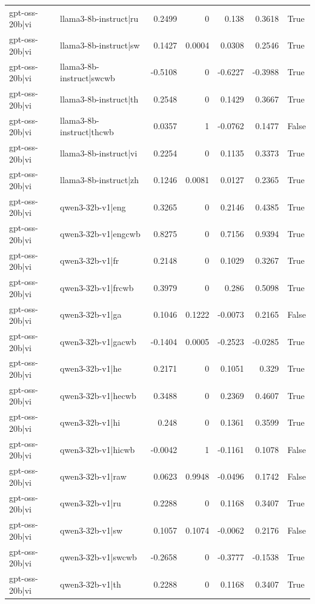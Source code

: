 \begin{table}
\begin{tabular}{l l r r r r l}
gpt-oss-20b|vi & llama3-8b-instruct|ru & 0.2499 & 0 & 0.138 & 0.3618 & True \\
gpt-oss-20b|vi & llama3-8b-instruct|sw & 0.1427 & 0.0004 & 0.0308 & 0.2546 & True \\
gpt-oss-20b|vi & llama3-8b-instruct|swcwb & -0.5108 & 0 & -0.6227 & -0.3988 & True \\
gpt-oss-20b|vi & llama3-8b-instruct|th & 0.2548 & 0 & 0.1429 & 0.3667 & True \\
gpt-oss-20b|vi & llama3-8b-instruct|thcwb & 0.0357 & 1 & -0.0762 & 0.1477 & False \\
gpt-oss-20b|vi & llama3-8b-instruct|vi & 0.2254 & 0 & 0.1135 & 0.3373 & True \\
gpt-oss-20b|vi & llama3-8b-instruct|zh & 0.1246 & 0.0081 & 0.0127 & 0.2365 & True \\
gpt-oss-20b|vi & qwen3-32b-v1|eng & 0.3265 & 0 & 0.2146 & 0.4385 & True \\
gpt-oss-20b|vi & qwen3-32b-v1|engcwb & 0.8275 & 0 & 0.7156 & 0.9394 & True \\
gpt-oss-20b|vi & qwen3-32b-v1|fr & 0.2148 & 0 & 0.1029 & 0.3267 & True \\
gpt-oss-20b|vi & qwen3-32b-v1|frcwb & 0.3979 & 0 & 0.286 & 0.5098 & True \\
gpt-oss-20b|vi & qwen3-32b-v1|ga & 0.1046 & 0.1222 & -0.0073 & 0.2165 & False \\
gpt-oss-20b|vi & qwen3-32b-v1|gacwb & -0.1404 & 0.0005 & -0.2523 & -0.0285 & True \\
gpt-oss-20b|vi & qwen3-32b-v1|he & 0.2171 & 0 & 0.1051 & 0.329 & True \\
gpt-oss-20b|vi & qwen3-32b-v1|hecwb & 0.3488 & 0 & 0.2369 & 0.4607 & True \\
gpt-oss-20b|vi & qwen3-32b-v1|hi & 0.248 & 0 & 0.1361 & 0.3599 & True \\
gpt-oss-20b|vi & qwen3-32b-v1|hicwb & -0.0042 & 1 & -0.1161 & 0.1078 & False \\
gpt-oss-20b|vi & qwen3-32b-v1|raw & 0.0623 & 0.9948 & -0.0496 & 0.1742 & False \\
gpt-oss-20b|vi & qwen3-32b-v1|ru & 0.2288 & 0 & 0.1168 & 0.3407 & True \\
gpt-oss-20b|vi & qwen3-32b-v1|sw & 0.1057 & 0.1074 & -0.0062 & 0.2176 & False \\
gpt-oss-20b|vi & qwen3-32b-v1|swcwb & -0.2658 & 0 & -0.3777 & -0.1538 & True \\
gpt-oss-20b|vi & qwen3-32b-v1|th & 0.2288 & 0 & 0.1168 & 0.3407 & True \\

\end{tabular}
\end{table}
